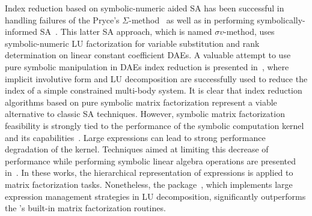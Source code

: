 Index reduction based on symbolic-numeric aided \ac{SA} has been successful in handling failures of the Pryce's $\Sigma$-method~\cite{tan2016symbolic} as well as in performing symbolically-informed \ac{SA}~\cite{chowdhry2004symbolic}. This latter \ac{SA} approach, which is named $\sigma v$-method, uses symbolic-numeric \ac{LU} factorization for variable substitution and rank determination on linear constant coefficient \acp{DAE}. A valuable attempt to use pure symbolic manipulation in \acp{DAE} index reduction is presented in~\cite{zhou2005implicit, zhou2007symbolic, zhou2007symbolicseq}, where implicit involutive form and \ac{LU} decomposition are successfully used to reduce the index of a simple constrained multi-body system. It is clear that index reduction algorithms based on pure symbolic matrix factorization represent a viable alternative to classic \ac{SA} techniques. However, symbolic matrix factorization feasibility is strongly tied to the performance of the symbolic computation kernel and its capabilities~\cite{zhou2008fraction}. Large expressions can lead to strong performance degradation of the kernel. Techniques aimed at limiting this decrease of performance while performing symbolic linear algebra operations are presented in~\cite{zhou2006hierarchical, zhou2007symbolic, zhou2007symbolicseq}. In these works, the hierarchical representation of expressions is applied to matrix factorization tasks. Nonetheless, the \LULEM{} package~\cite{carette2006linear}, which implements large expression management strategies in \ac{LU} decomposition, significantly outperforms the \Maple{}'s built-in matrix factorization routines.

